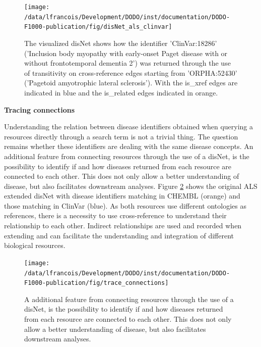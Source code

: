 \documentclass[9pt,a4paper,]{extarticle}
\begin{document}
\begin{figure}

{\centering \texttt{[image: /data/lfrancois/Development/DODO/inst/documentation/DODO-F1000-publication/fig/disNet\_als\_clinvar]} 

}

\caption{The visualized disNet shows how the identifier 'ClinVar:18286' ('Inclusion body myopathy with early-onset Paget disease with or without frontotemporal dementia 2') was returned through the use of transitivity on cross-reference edges starting from 'ORPHA:52430' ('Pagetoid amyotrophic lateral sclerosis'). With the is\_xref edges are indicated in blue and the is\_related edges indicated in orange.}\label{fig:disnetALSclinvar}
\end{figure}

\textbf{Tracing connections}

Understanding the relation between disease identifiers obtained when querying a resources directly through a search term is not a trivial thing. The question remains whether these identifiers are dealing with the same disease concepts. An additional feature from connecting resources through the use of a disNet, is the possibility to identify if and how diseases returned from each resource are connected to each other. This does not only allow a better understanding of disease, but also facilitates downstream analyses. Figure \ref{fig:traceConn} shows the original ALS extended disNet with disease identifiers matching in CHEMBL (orange) and those matching in ClinVar (blue). As both resources use different ontologies as references, there is a necessity to use cross-reference to understand their relationship to each other. Indirect relationships are used and recorded when extending and can facilitate the understanding and integration of different biological resources.

\begin{figure}

{\centering \texttt{[image: /data/lfrancois/Development/DODO/inst/documentation/DODO-F1000-publication/fig/trace\_connections]} 

}

\caption{A additional feature from connecting resources through the use of a disNet, is the possibility to identify if and how diseases returned from each resource are connected to each other. This does not only allow a better understanding of disease, but also facilitates downstream analyses.}\label{fig:traceConn}
\end{figure}
\end{document}
